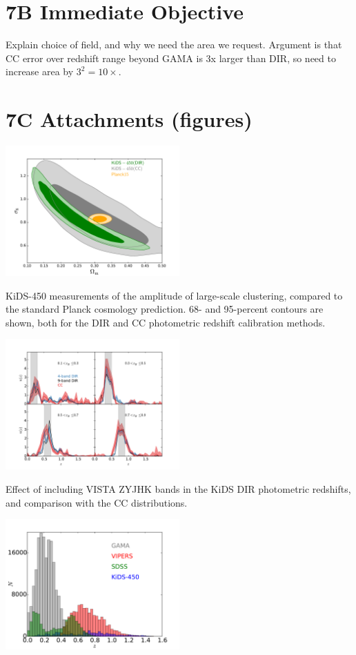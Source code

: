 \documentclass[a4paper, 10pt]{article}
\begin{document}
\section*{7B Immediate Objective}

Explain choice of field, and why we need the area we request. Argument is that CC error over redshift range beyond GAMA is 3x larger than DIR, so need to increase area by $3^2=10\times$.


\section*{7C Attachments (figures)}
\includegraphics[width=0.5\textwidth]{banana_DIR_vs_CC_vs_Planck.pdf}

KiDS-450 measurements of the amplitude of large-scale clustering, compared to the standard Planck cosmology prediction. 68- and 95-percent contours are shown, both for the DIR and CC photometric redshift calibration methods.  
\bigskip

\includegraphics[width=0.5\textwidth]{Nz_comp_zall_4vs9vsCC.pdf}

Effect of including VISTA ZYJHK bands in the KiDS DIR photometric redshifts, and comparison with the CC distributions.

\bigskip

\includegraphics[width=0.5\textwidth]{ESO_prop_plot_zdist.pdf}
\end{document}
